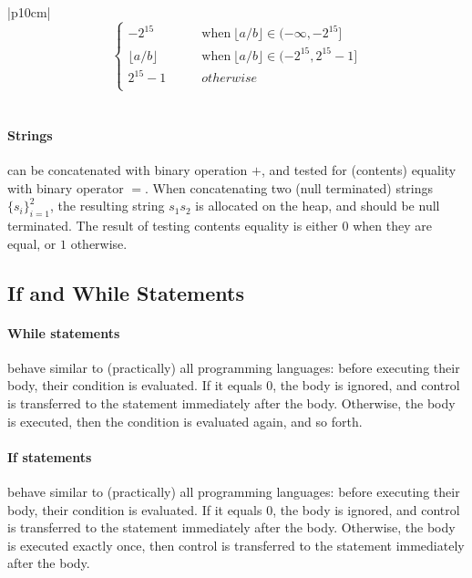 \documentclass{article}
\begin{document}
\begin{table}[h]
\begin{tabular}{|p{10cm}|}
\[\begin{cases}
-2^{15}             ~ & ~ ~ ~ ~ ~ ~ ~ ~ \text{when} ~ \lfloor a/b \rfloor \in (-\infty, -2^{15}] \\
\lfloor a/b \rfloor ~ & ~ ~ ~ ~ ~ ~ ~ ~ \text{when} ~ \lfloor a/b \rfloor \in (-2^{15},2^{15}-1] \\
2^{15}-1            ~ & ~ ~ ~ ~ ~ ~ ~ ~ otherwise                                                \\
\end{cases}
\]
\\ \hline
\end{tabular}
\caption{Semantics of Picasso binary operations between integers
\label{Table_Semantics_Of_Rio_Mare_Binary_Operations_Between_Integers}}
\end{table}
\paragraph{Strings} can be concatenated with binary operation $+$,
and tested for (contents) equality with binary operator $=$.
When concatenating two (null terminated) strings $\{s_{i}\}_{i=1}^{2}$,
the resulting string $s_{1}s_{2}$ is allocated on the heap,
and should be null terminated. The result of testing contents equality
is either $0$ when they are equal, or $1$ otherwise.
\newpage
\subsection{If and While Statements}
\label{subsection_If_And_While_Statements}
\paragraph{While statements} behave similar to (practically) all programming languages:
before executing their body, their condition is evaluated.
If it equals $0$, the body is ignored, and control is transferred
to the statement immediately after the body.
Otherwise, the body is executed, then the condition is evaluated again, and so forth. 
\paragraph{If statements} behave similar to (practically) all programming languages:
before executing their body, their condition is evaluated.
If it equals $0$, the body is ignored, and control is transferred
to the statement immediately after the body.
Otherwise, the body is executed exactly once,
then control is transferred to the statement immediately after the body. 
\end{document}
